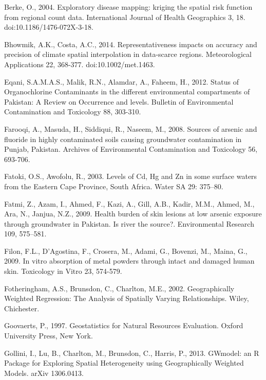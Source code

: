 \begin{thebibliography}
\bibitem{} \hangindent=1cm Berke, O., 2004. Exploratory disease mapping: kriging the spatial risk function from regional count data. International Journal of Health Geographics 3, 18. doi:10.1186/1476-072X-3-18.

\bibitem{} \hangindent=1cm Bhowmik, A.K., Costa, A.C., 2014. Representativeness impacts on accuracy and precision of climate spatial interpolation in data-scarce regions. Meteorological Applications 22, 368-377. doi:10.1002/met.1463.

\bibitem{} \hangindent=1cm Eqani, S.A.M.A.S., Malik, R.N., Alamdar, A., Faheem, H., 2012. Status of Organochlorine Contaminants in the different environmental compartments of Pakistan: A Review on Occurrence and levels. Bulletin of Environmental Contamination and Toxicology 88, 303-310.

\bibitem{} \hangindent=1cm Farooqi, A., Masuda, H., Siddiqui, R., Naseem, M., 2008. Sources of arsenic and fluoride in highly contaminated soils causing groundwater contamination in Punjab, Pakistan. Archives of Environmental Contamination and Toxicology 56, 693-706.

\bibitem{} \hangindent=1cm Fatoki, O.S., Awofolu, R., 2003. Levels of Cd, Hg and Zn in some surface waters from the Eastern Cape Province, South Africa. Water SA 29: 375–80.

\bibitem{} \hangindent=1cm Fatmi, Z., Azam, I., Ahmed, F., Kazi, A., Gill, A.B., Kadir, M.M., Ahmed, M., Ara, N., Janjua, N.Z., 2009. Health burden of skin lesions at low arsenic exposure through groundwater in Pakistan. Is river the source?. Environmental Research 109, 575–581.

\bibitem{} \hangindent=1cm Filon, F.L., D’Agostina, F., Crosera, M., Adami, G., Bovenzi, M., Maina, G., 2009. In vitro absorption of metal powders through intact and damaged human skin. Toxicology in Vitro 23, 574-579.

\bibitem{} \hangindent=1cm Fotheringham, A.S., Brunsdon, C., Charlton, M.E., 2002. Geographically Weighted Regression: The Analysis of Spatially Varying Relationships. Wiley, Chichester.

\bibitem{} \hangindent=1cm Goovaerts, P., 1997. Geostatistics for Natural Resources Evaluation. Oxford University Press, New York.

\bibitem{} \hangindent=1cm Gollini, I., Lu, B., Charlton, M., Brunsdon, C., Harris, P., 2013. GWmodel: an R Package for Exploring Spatial Heterogeneity using Geographically Weighted Models. arXiv 1306.0413.


\end{thebibliography}
